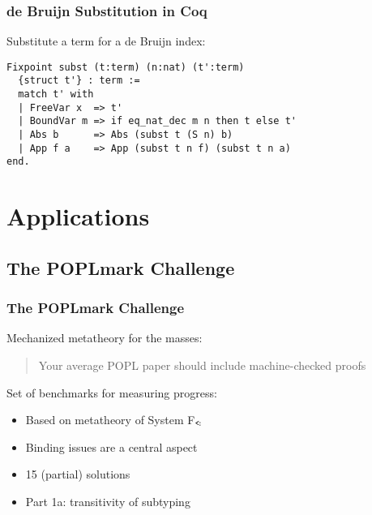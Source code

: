 \documentclass[notheorems]{beamer}
\begin{document}
\begin{frame}[fragile]

  \frametitle{de Bruijn Substitution in Coq}

  Substitute a term for a de Bruijn index:
  \begin{lstlisting}
Fixpoint subst (t:term) (n:nat) (t':term)
  {struct t'} : term :=
  match t' with
  | FreeVar x  => t'
  | BoundVar m => if eq_nat_dec m n then t else t'
  | Abs b      => Abs (subst t (S n) b)
  | App f a    => App (subst t n f) (subst t n a)
end.
  \end{lstlisting}

\end{frame}


\section{Applications}


\subsection{The POPLmark Challenge}




\begin{frame}

  \frametitle{The POPLmark Challenge}

  Mechanized metatheory for the masses:
  \begin{quote}
    Your average POPL paper should include machine-checked proofs
  \end{quote}

  Set of benchmarks for measuring progress:
  \begin{itemize}
    \item Based on metatheory of System F$_\texttt{<\!:}$
    \item Binding issues are a central aspect
    \item 15 (partial) solutions
    \item Part 1a: transitivity of subtyping
  \end{itemize}

\end{frame}
\end{document}
